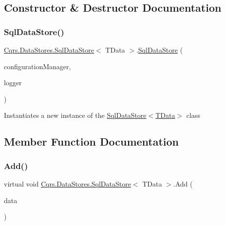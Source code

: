 \subsection{Constructor \& Destructor Documentation}
\mbox{\label{classCqrs_1_1DataStores_1_1SqlDataStore_a0ce9b3f74799e463d4f53eda386d5577_a0ce9b3f74799e463d4f53eda386d5577}} 
\subsubsection{\texorpdfstring{Sql\+Data\+Store()}{SqlDataStore()}}
{\footnotesize\ttfamily \hyperlink{classCqrs_1_1DataStores_1_1SqlDataStore}{Cqrs.\+Data\+Stores.\+Sql\+Data\+Store}$<$ T\+Data $>$.\hyperlink{classCqrs_1_1DataStores_1_1SqlDataStore}{Sql\+Data\+Store} (\begin{DoxyParamCaption}\item[{\hyperlink{interfaceCqrs_1_1Configuration_1_1IConfigurationManager}{I\+Configuration\+Manager}}]{configuration\+Manager,  }\item[{I\+Logger}]{logger }\end{DoxyParamCaption})}



Instantiates a new instance of the \hyperlink{classCqrs_1_1DataStores_1_1SqlDataStore_a0ce9b3f74799e463d4f53eda386d5577_a0ce9b3f74799e463d4f53eda386d5577}{Sql\+Data\+Store$<$\+T\+Data$>$} class 



\subsection{Member Function Documentation}
\mbox{\label{classCqrs_1_1DataStores_1_1SqlDataStore_abcca53d2e93dbdfb193a9fb0996849c5_abcca53d2e93dbdfb193a9fb0996849c5}} 
\subsubsection{\texorpdfstring{Add()}{Add()}\hspace{0.1cm}{\footnotesize\ttfamily [1/2]}}
{\footnotesize\ttfamily virtual void \hyperlink{classCqrs_1_1DataStores_1_1SqlDataStore}{Cqrs.\+Data\+Stores.\+Sql\+Data\+Store}$<$ T\+Data $>$.Add (\begin{DoxyParamCaption}\item[{T\+Data}]{data }\end{DoxyParamCaption})\hspace{0.3cm}{\ttfamily [virtual]}}



